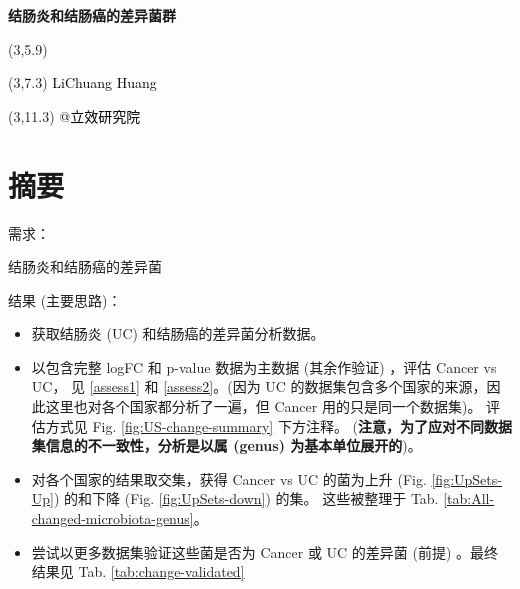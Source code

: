 \documentclass[
]{article}
\author{}
\date{\vspace{-2.5em}}
\providecommand{\tightlist}{%
  \setlength{\itemsep}{0pt}\setlength{\parskip}{0pt}}
\begin{document}
\begin{titlepage} 
\begin{center} \textbf{\Huge
结肠炎和结肠癌的差异菌群} \vspace{4em}
\begin{textblock}{10}(3,5.9) \huge
\textbf{\textcolor{white}{2024-03-18}}
\end{textblock} \begin{textblock}{10}(3,7.3)
\Large \textcolor{black}{LiChuang Huang}
\end{textblock} \begin{textblock}{10}(3,11.3)
\Large \textcolor{black}{@立效研究院}
\end{textblock} \end{center} \end{titlepage}
\restoregeometry


\tableofcontents

\listoffigures

\listoftables

\newpage


\hypertarget{abstract}{%
\section{摘要}\label{abstract}}

需求：

结肠炎和结肠癌的差异菌

结果 (主要思路)：

\begin{itemize}
\tightlist
\item
  获取结肠炎 (UC) 和结肠癌的差异菌分析数据。
\item
  以包含完整 logFC 和 p-value 数据为主数据 (其余作验证) ，评估 Cancer vs UC，
  见 \ref{assess1} 和 \ref{assess2}。(因为 UC
  的数据集包含多个国家的来源，因此这里也对各个国家都分析了一遍，但 Cancer
  用的只是同一个数据集)。
  评估方式见 Fig. \ref{fig:US-change-summary} 下方注释。
  (\textbf{注意，为了应对不同数据集信息的不一致性，分析是以属 (genus) 为基本单位展开的})。
\item
  对各个国家的结果取交集，获得 Cancer vs UC 的菌为上升 (Fig. \ref{fig:UpSets-Up}) 的和下降 (Fig. \ref{fig:UpSets-down}) 的集。
  这些被整理于 Tab. \ref{tab:All-changed-microbiota-genus}。
\item
  尝试以更多数据集验证这些菌是否为 Cancer 或 UC 的差异菌 (前提) 。最终结果见 Tab. \ref{tab:change-validated}
\end{itemize}
\end{document}
